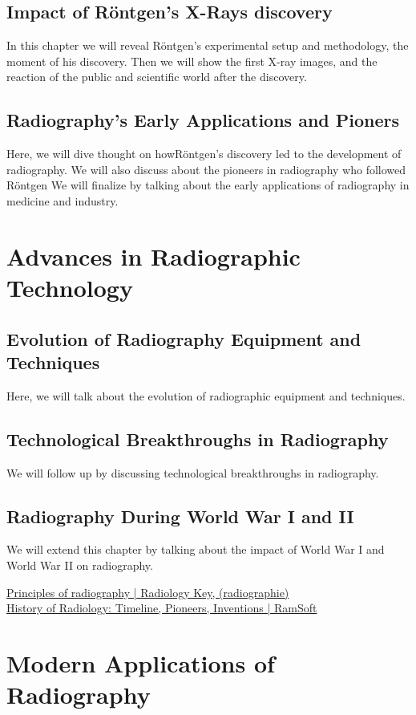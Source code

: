 \documentclass[a4paper,12pt]{report}
\begin{document}
\section{Impact of Röntgen's X-Rays discovery}
In this chapter we will reveal Röntgen's experimental setup and methodology, the moment of his discovery. Then we will show the first X-ray images, and the reaction of the public and scientific world after the discovery.
\section{Radiography's Early Applications and Pioners}
Here, we will dive thought on howRöntgen's discovery led to the development of radiography. We will also discuss about the pioneers in radiography who followed Röntgen We will finalize by talking about the early applications of radiography in medicine and industry.

\chapter{Advances  in Radiographic Technology}
\section{Evolution of Radiography Equipment and Techniques}
Here, we will talk about the evolution of radiographic equipment and techniques. 
\section{	Technological Breakthroughs in Radiography}
We will follow up by discussing technological breakthroughs in radiography. 
\section{Radiography During World War I and II}
We will extend this chapter by talking about the impact of World War I and World War II on radiography. 

\href{https://radiologykey.com/principles-of-radiography/}{Principles of radiography | Radiology Key, (radiographie) }\\
\href{https://www.ramsoft.com/history-of-radiology/}{History of Radiology: Timeline, Pioneers, Inventions | RamSoft  }

\chapter{Modern Applications of Radiography}
\end{document}
